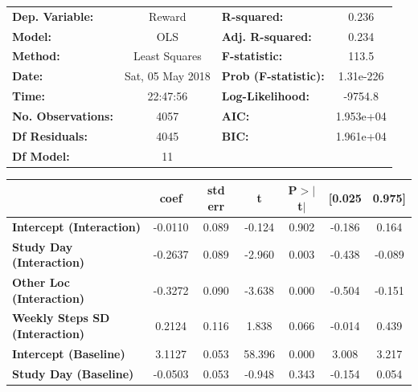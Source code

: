 \begin{table}
\begin{tabular}{lclc}
\toprule
\textbf{Dep. Variable:}                &      Reward       & \textbf{  R-squared:         } &     0.236   \\
\textbf{Model:}                        &       OLS        & \textbf{  Adj. R-squared:    } &     0.234   \\
\textbf{Method:}                       &  Least Squares   & \textbf{  F-statistic:       } &     113.5   \\
\textbf{Date:}                         & Sat, 05 May 2018 & \textbf{  Prob (F-statistic):} & 1.31e-226   \\
\textbf{Time:}                         &     22:47:56     & \textbf{  Log-Likelihood:    } &   -9754.8   \\
\textbf{No. Observations:}             &        4057      & \textbf{  AIC:               } & 1.953e+04   \\
\textbf{Df Residuals:}                 &        4045      & \textbf{  BIC:               } & 1.961e+04   \\
\textbf{Df Model:}                     &          11      & \textbf{                     } &             \\
\bottomrule
\end{tabular}
\begin{tabular}{lcccccc}
                                       & \textbf{coef} & \textbf{std err} & \textbf{t} & \textbf{P$>$$|$t$|$} & \textbf{[0.025} & \textbf{0.975]}  \\
\midrule
\textbf{Intercept (Interaction)}       &      -0.0110  &        0.089     &    -0.124  &         0.902        &       -0.186    &        0.164     \\
\textbf{Study Day (Interaction)}       &      -0.2637  &        0.089     &    -2.960  &         0.003        &       -0.438    &       -0.089     \\
\textbf{Other Loc (Interaction)}       &      -0.3272  &        0.090     &    -3.638  &         0.000        &       -0.504    &       -0.151     \\
\textbf{Weekly Steps SD (Interaction)} &       0.2124  &        0.116     &     1.838  &         0.066        &       -0.014    &        0.439     \\
\textbf{Intercept (Baseline)}          &       3.1127  &        0.053     &    58.396  &         0.000        &        3.008    &        3.217     \\
\textbf{Study Day (Baseline)}          &      -0.0503  &        0.053     &    -0.948  &         0.343        &       -0.154    &        0.054     \\

\end{tabular}
\end{table}
